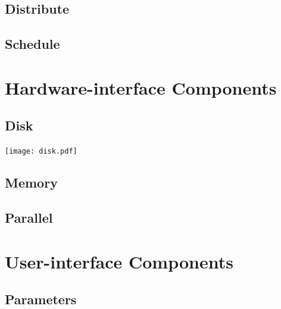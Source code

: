 \documentclass{paper}
\begin{document}
\subsection{Distribute}
\subsection{Schedule}
\section{Hardware-interface Components}
\subsection{Disk}
\centerline{\texttt{[image: disk.pdf]}}
\subsection{Memory}
\subsection{Parallel}
\section{User-interface Components}
\subsection{Parameters}
\end{document}
